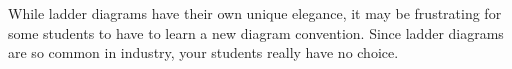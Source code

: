 





While ladder diagrams have their own unique elegance, it may be frustrating for some students to have to learn a new diagram convention.  Since ladder diagrams are so common in industry, your students really have no choice.




